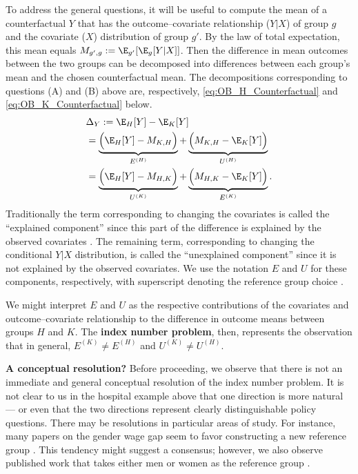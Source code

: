 To address the general questions, it will be useful to compute the mean of a counterfactual $Y$ that has the outcome--covariate relationship ($Y|X$) of group $g$ and the covariate ($X$) distribution of group $g'$. By the law of total expectation, this mean equals
$M_{g',g} := \E_{g'} [ \E_g  [ Y | X ] ]$.
Then the difference in mean outcomes between the two groups can be decomposed into differences between each group's mean
and the chosen counterfactual mean. The decompositions corresponding to questions (A) and (B) above are, respectively, 
\cref{eq:OB_H_Counterfactual} and \cref{eq:OB_K_Counterfactual} below.
%
\begin{align}
	\nonumber
    &\Delta_Y := \E_H[Y] - \E_K[Y] \\ 
    \label{eq:OB_H_Counterfactual}
    &=\underbrace{\Big(\E_H[Y] - M_{K,H} \Big)}_{E^{(H)}} 
     + \underbrace{\Big( M_{K,H} - \E_K[Y]\Big)}_{U^{(H)} } \\
     \label{eq:OB_K_Counterfactual}
     &=\underbrace{\Big(\E_H[Y] - M_{H,K} \Big)}_{U^{(K)}} 
     + \underbrace{\Big(M_{H,K} - \E_K[Y]\Big)}_{E^{(K)}}.
\end{align} 
%
Traditionally the term corresponding to changing the covariates is called the
``explained component'' since this part of the difference is explained by the observed
covariates \citep{fortinLemieuxFirpo2011}. The remaining term, corresponding to changing the conditional $Y|X$ distribution,
is called the ``unexplained component'' since it is not explained by the observed covariates. We use the 
notation $E$ and $U$ for these components, respectively, with superscript denoting 
the reference group choice \cite{fortinLemieuxFirpo2011}.

We might interpret $E$ and $U$ as the respective contributions of the covariates and outcome--covariate relationship to the 
difference in outcome means between groups $H$ and $K$. The \textbf{index number problem}, then, represents the observation
that in general, $E^{(K)} \neq E^{(H)}$ and $U^{(K)} \neq U^{(H)}$.

\textbf{A conceptual resolution?}
Before proceeding, we observe that there is not an immediate and general conceptual resolution of the index number problem.
It is not clear to us in the hospital example above that one direction is more natural --- or even that the two
directions represent clearly distinguishable policy questions.
There may be resolutions in particular areas of study.
For instance, many papers on the gender wage gap seem to favor constructing a new reference group \citep{reimers1983,cotton1988,neumark1988,kassenboehmer2014distributional,bachan2022genderchancellor}.
This tendency might suggest a consensus; however, we also observe published work that takes either men or women as the reference group \citep{nielsen2000wage,piazzalunga2019increase,leythienne2021paygapeu,tao2024gender,paradaContzen2025}.
